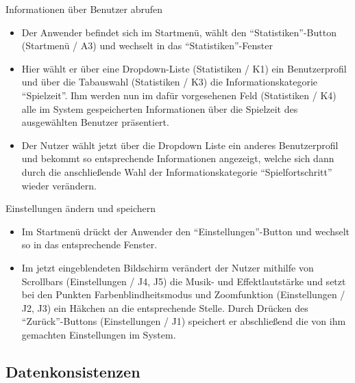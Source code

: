 \begin{requirements}
\begin{itemize}
  			
  	\end{itemize}
  			

  	
  	 Informationen über Benutzer abrufen
  	
  	
  	\begin{itemize}
  	
		\item Der Anwender befindet sich im Startmenü, wählt den "`Statistiken"'-Button (Startmenü / A3) und wechselt in das "`Statistiken"'-Fenster
		
		\item Hier wählt er über eine Dropdown-Liste (Statistiken / K1) ein Benutzerprofil und über die Tabauswahl (Statistiken / K3) die Informationskategorie "`Spielzeit"'. Ihm werden nun im dafür vorgesehenen Feld (Statistiken / K4) alle im System gespeicherten Informationen über die Spielzeit des ausgewählten Benutzer präsentiert.
		
		\item Der Nutzer wählt jetzt über die Dropdown Liste ein anderes Benutzerprofil und bekommt so entsprechende Informationen angezeigt, welche sich dann durch die anschließende Wahl der Informationskategorie "`Spielfortschritt"' wieder verändern.
		
  	
  	\end{itemize}
  	
  	
  	
  	 Einstellungen ändern und speichern
  	
  	
  	\begin{itemize}
  	
		\item Im Startmenü drückt der Anwender den "`Einstellungen"'-Button und wechselt so in das entsprechende Fenster.
		
		\item Im jetzt eingeblendeten Bildschirm verändert der Nutzer mithilfe von Scrollbars (Einstellungen / J4, J5) die Musik- und Effektlautstärke und setzt bei den Punkten Farbenblindheitsmodus und Zoomfunktion (Einstellungen / J2, J3) ein Häkchen an die entsprechende Stelle. Durch Drücken des "`Zurück"'-Buttons (Einstellungen / J1) speichert er abschließend die von ihm gemachten Einstellungen im System.
  	
  	\end{itemize}
  	
  	
\end{requirements}
  		
\subsection{Datenkonsistenzen}

